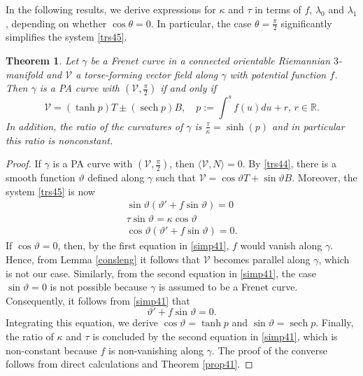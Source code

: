 \documentclass[12pt]{amsart}
\def\r{\mathbb R}
\def\v{\mathcal V}
\DeclareMathOperator{\sech}{sech}
\newtheorem{theorem}{Theorem}[section]
\theoremstyle{definition}
\begin{document}
In the following results, we derive expressions for $\kappa$ and $\tau$ in terms of $f$, $\lambda_0$ and $\lambda_1$, depending on whether $\cos \theta = 0$. In particular, the case $\theta = \frac{\pi}{2}$ significantly simplifies the system \eqref{trs45}.


\begin{theorem}\label{thm42}
Let $\gamma $ be a Frenet curve in a connected orientable Riemannian $3$-manifold and $\v$ a torse-forming vector field along $\gamma$ with potential function $f$. Then $\gamma$ is a PA curve with $(\v,\frac{\pi}{2})$ if and only if 
$$
\v=(\tanh p) T\pm (\sech p) B, \quad p:=\int^s f(u)du+r, \, r\in \r.
$$
In addition, the ratio of the curvatures of $\gamma$ is $\frac{\tau}{\kappa}=\sinh (p)$ and in particular this ratio is nonconstant.
\end{theorem}
\begin{proof}
If $\gamma$ is a PA curve with $(\v,\frac{\pi}{2})$, then $\langle\v,N\rangle=0$. By \eqref{trs44}, there is a smooth function $\vartheta$ defined along $\gamma$ such that $\v=\cos \vartheta T+\sin\vartheta B$.
Moreover, the system \eqref{trs45} is now
\begin{equation}
\left. 
\begin{array}{r}
\sin\vartheta(\vartheta'+f\sin\vartheta)=0 \\ [4pt]
\tau\sin\vartheta=\kappa \cos\vartheta \\ [4pt]
\cos\vartheta\left(\vartheta'+f\sin\vartheta\right)=0.
\end{array}%
\right. \label{simp41}
\end{equation}
If $\cos\vartheta=0$, then, by the first equation in \eqref{simp41}, $f$ would vanish along $\gamma$. Hence, from Lemma \ref{consleng} it follows that $\v$ becomes parallel along $\gamma$, which is not our case. Similarly, from the second equation in \eqref{simp41}, the case $\sin\vartheta=0$ is not possible because  $\gamma$ is assumed to be a Frenet curve. Consequently, it follows from \eqref{simp41} that
$$
\vartheta'+f\sin\vartheta=0.
$$
Integrating this equation, we derive $\cos\vartheta=\tanh p$ and $ \sin\vartheta=\sech p.$ Finally, the ratio of $\kappa$ and $\tau$ is concluded by the second equation in \eqref{simp41}, which is non-constant because $f$ is non-vanishing along $\gamma$. The proof of the converse follows from direct calculations and Theorem \ref{prop41}.

\end{proof}
\end{document}
